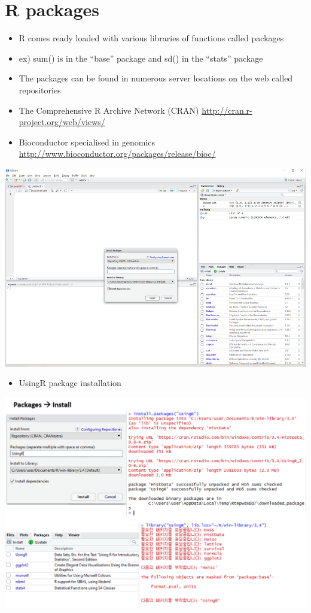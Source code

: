 \documentclass[]{book}
\providecommand{\tightlist}{%
  \setlength{\itemsep}{0pt}\setlength{\parskip}{0pt}}
\begin{document}
\hypertarget{r-packages}{%
\section{R packages}\label{r-packages}}

\begin{itemize}
\tightlist
\item
  R comes ready loaded with various libraries of functions called packages
\item
  ex) sum() is in the ``base'' package and sd() in the ``stats'' package
\item
  The packages can be found in numerous server locations on the web called repositories
\item
  The Comprehensive R Archive Network (CRAN) \url{http://cran.r-project.org/web/views/}
\item
  Bioconductor specialised in genomics \url{http://www.bioconductor.org/packages/release/bioc/}
\end{itemize}

\includegraphics{images/01-18.png}

\begin{itemize}
\tightlist
\item
  UsingR package installation
\end{itemize}

\includegraphics{images/01-19.png}
\end{document}
